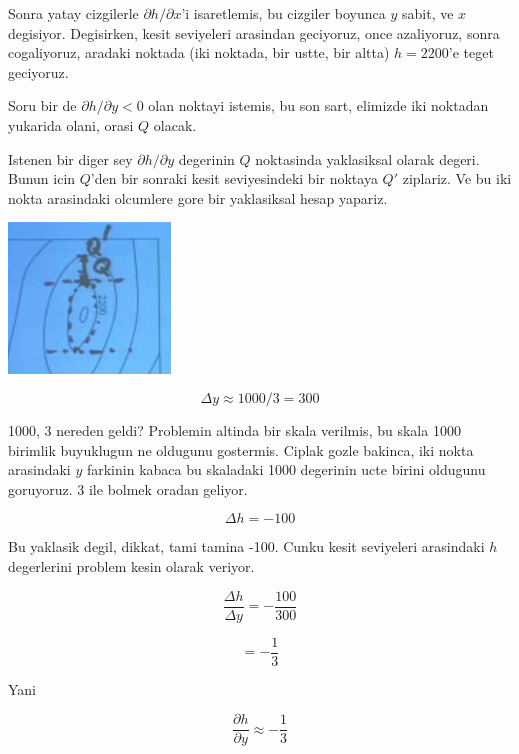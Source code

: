 \documentclass[12pt,fleqn]{article}
\begin{document}
Sonra yatay cizgilerle $\partial h/\partial x$'i isaretlemis, bu cizgiler
boyunca $y$ sabit, ve $x$ degisiyor. Degisirken, kesit seviyeleri arasindan
geciyoruz, once azaliyoruz, sonra cogaliyoruz, aradaki noktada (iki
noktada, bir ustte, bir altta) $h=2200$'e teget geciyoruz. 

Soru bir de  $\partial h/\partial y < 0$ olan noktayi istemis, bu son sart,
elimizde iki noktadan yukarida olani, orasi $Q$ olacak. 

Istenen bir diger sey $\partial h/\partial y$ degerinin $Q$ noktasinda
yaklasiksal olarak degeri. Bunun icin $Q$'den bir sonraki kesit
seviyesindeki bir noktaya $Q'$ ziplariz. Ve bu iki nokta arasindaki
olcumlere gore bir yaklasiksal hesap yapariz. 

\includegraphics[height=4cm]{15_4.png}


\[ \Delta y \approx 1000 / 3 = 300 \]

1000, 3 nereden geldi? Problemin altinda bir skala verilmis, bu skala 1000
birimlik buyuklugun ne oldugunu gostermis. Ciplak gozle bakinca, iki nokta
arasindaki $y$ farkinin kabaca bu skaladaki 1000 degerinin ucte birini
oldugunu goruyoruz. 3 ile bolmek oradan geliyor. 

\[ \Delta h = -100 \]

Bu yaklasik degil, dikkat, tami tamina -100. Cunku kesit seviyeleri
arasindaki $h$ degerlerini problem kesin olarak veriyor.

\[ 
\frac{\Delta h}{\Delta y} = -\frac{100}{300}
 \]

\[ = -\frac{1}{3} \]

Yani 

\[ 
\frac{\partial h}{\partial y} \approx -\frac{1}{3}
 \]
\end{document}
